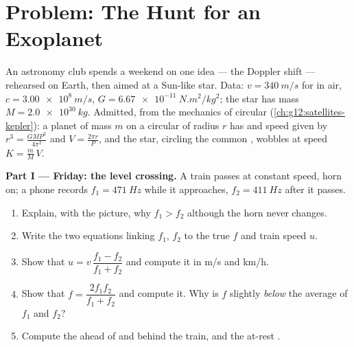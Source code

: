 \section{Problem: The Hunt for an Exoplanet}

\begin{problem}
\label{pb:g12:doppler-effect:1}
An astronomy club spends a weekend on one idea --- the Doppler shift --- rehearsed on Earth,
then aimed at a Sun-like star. Data: $v = \qty{340}{m/s}$ for  in air,
$c = \qty{3.00e8}{m/s}$, $G = \qty{6.67e-11}{N.m^2/kg^2}$; the star has mass
$M = \qty{2.0e30}{kg}$. Admitted, from the mechanics of circular 
(\cref{ch:g12:satellites-kepler}): a planet of mass $m$ on a circular  of radius $r$
has  and speed given by $r^3 = \frac{G M P^2}{4\pi^2}$ and $V = \frac{2\pi r}{P}$,
and the star, circling the common , wobbles at speed $K = \frac{m}{M}\,V$.

\medskip
\noindent\textbf{Part I --- Friday: the level crossing.}
A train passes at constant speed, horn on; a phone records $f_1 = \qty{471}{Hz}$ while it
approaches, $f_2 = \qty{411}{Hz}$ after it passes.
\begin{enumerate}
  \item Explain, with the  picture, why $f_1 > f_2$ although the horn never changes.
  \item Write the two equations linking $f_1$, $f_2$ to the true  $f$ and train speed $u$.
  \item Show that $u = v\,\dfrac{f_1 - f_2}{f_1 + f_2}$ and compute it in \unit{m/s} and \unit{km/h}.
  \item Show that $f = \dfrac{2 f_1 f_2}{f_1 + f_2}$ and compute it. Why is $f$ slightly
        \emph{below} the average of $f_1$ and $f_2$?
  \item Compute the  ahead of and behind the train, and the at-rest .
\end{enumerate}


\end{problem}
